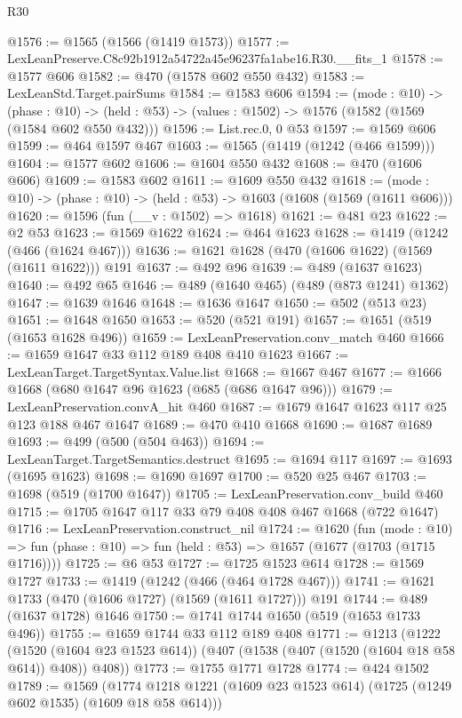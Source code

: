 \begin{lexlean}{R30}
\begin{coremodule}
@1576 := @1565 (@1566 (@1419 @1573))
@1577 := LexLeanPreserve.C8c92b1912a54722a45e96237fa1abe16.R30.__fits_1
@1578 := @1577 @606
@1582 := @470 (@1578 @602 @550 @432)
@1583 := LexLeanStd.Target.pairSums
@1584 := @1583 @606
@1594 := (mode : @10) ->
  (phase : @10) -> (held : @53) -> (values : @1502) -> @1576 (@1582 (@1569 (@1584 @602 @550 @432)))
@1596 := List.rec.{0, 0} @53
@1597 := @1569 @606
@1599 := @464 @1597 @467
@1603 := @1565 (@1419 (@1242 (@466 @1599)))
@1604 := @1577 @602
@1606 := @1604 @550 @432
@1608 := @470 (@1606 @606)
@1609 := @1583 @602
@1611 := @1609 @550 @432
@1618 := (mode : @10) -> (phase : @10) -> (held : @53) -> @1603 (@1608 (@1569 (@1611 @606)))
@1620 := @1596 (fun (__v : @1502) => @1618)
@1621 := @481 @23
@1622 := @2 @53
@1623 := @1569 @1622
@1624 := @464 @1623
@1628 := @1419 (@1242 (@466 (@1624 @467)))
@1636 := @1621 @1628 (@470 (@1606 @1622) (@1569 (@1611 @1622))) @191
@1637 := @492 @96
@1639 := @489 (@1637 @1623)
@1640 := @492 @65
@1646 := @489 (@1640 @465) (@489 (@873 @1241) @1362)
@1647 := @1639 @1646
@1648 := @1636 @1647
@1650 := @502 (@513 @23)
@1651 := @1648 @1650
@1653 := @520 (@521 @191)
@1657 := @1651 (@519 (@1653 @1628 @496))
@1659 := LexLeanPreservation.conv_match @460
@1666 := @1659 @1647 @33 @112 @189 @408 @410 @1623
@1667 := LexLeanTarget.TargetSyntax.Value.list
@1668 := @1667 @467
@1677 := @1666 @1668 (@680 @1647 @96 @1623 (@685 (@686 @1647 @96)))
@1679 := LexLeanPreservation.convA_hit @460
@1687 := @1679 @1647 @1623 @117 @25 @123 @188 @467 @1647
@1689 := @470 @410 @1668
@1690 := @1687 @1689
@1693 := @499 (@500 (@504 @463))
@1694 := LexLeanTarget.TargetSemantics.destruct
@1695 := @1694 @117
@1697 := @1693 (@1695 @1623)
@1698 := @1690 @1697
@1700 := @520 @25 @467
@1703 := @1698 (@519 (@1700 @1647))
@1705 := LexLeanPreservation.conv_build @460
@1715 := @1705 @1647 @117 @33 @79 @408 @408 @467 @1668 (@722 @1647)
@1716 := LexLeanPreservation.construct_nil
@1724 := @1620
    (fun (mode : @10) =>
    fun (phase : @10) => fun (held : @53) => @1657 (@1677 (@1703 (@1715 @1716))))
@1725 := @6 @53
@1727 := @1725 @1523 @614
@1728 := @1569 @1727
@1733 := @1419 (@1242 (@466 (@464 @1728 @467)))
@1741 := @1621 @1733 (@470 (@1606 @1727) (@1569 (@1611 @1727))) @191
@1744 := @489 (@1637 @1728) @1646
@1750 := @1741 @1744 @1650 (@519 (@1653 @1733 @496))
@1755 := @1659 @1744 @33 @112 @189 @408
@1771 := @1213
    (@1222
      (@1520 (@1604 @23 @1523 @614))
      (@407 (@1538 (@407 (@1520 (@1604 @18 @58 @614)) @408)) @408))
@1773 := @1755 @1771 @1728
@1774 := @424 @1502
@1789 := @1569
    (@1774 @1218 @1221 (@1609 @23 @1523 @614) (@1725 (@1249 @602 @1535) (@1609 @18 @58 @614)))

\end{coremodule}
\end{lexlean}
